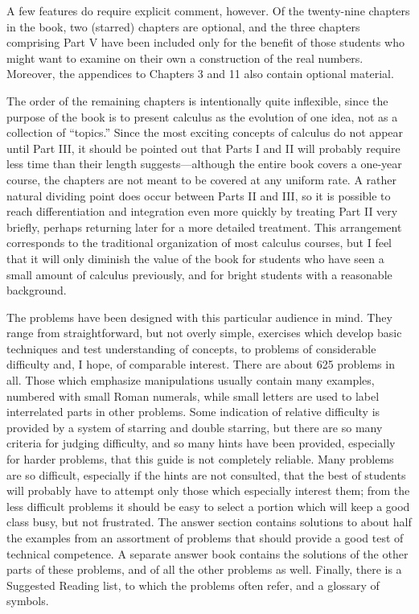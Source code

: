 A few features do require explicit comment, however. Of the twenty-nine
chapters in the book, two (starred) chapters are optional, and the three
chapters comprising Part V have been included only for the benefit of those
students who might want to examine on their own a construction of the real
numbers. Moreover, the appendices to Chapters 3 and 11 also contain optional
material.

The order of the remaining chapters is intentionally quite inflexible, since
the purpose of the book is to present calculus as the evolution of one idea,
not as a collection of ``topics.'' Since the most exciting concepts of calculus
do not appear until Part III, it should be pointed out that Parts I and II
will probably require less time than their length suggests---although the
entire book covers a one-year course, the chapters are not meant to be covered
at any uniform rate. A rather natural dividing point does occur between
Parts II and III, so it is possible to reach differentiation and integration
even more quickly by treating Part II very briefly, perhaps returning later for
a more detailed treatment. This arrangement corresponds to the traditional
organization of most calculus courses, but I feel that it will only diminish
the value of the book for students who have seen a small amount of calculus
previously, and for bright students with a reasonable background.

The problems have been designed with this particular audience in mind. They
range from straightforward, but not overly simple, exercises which develop
basic techniques and test understanding of concepts, to problems of
considerable difficulty and, I hope, of comparable interest. There are about
625 problems in all. Those which emphasize manipulations usually contain many
examples, numbered with small Roman numerals, while small letters are used to
label interrelated parts in other problems. Some indication of relative
difficulty is provided by a system of starring and double starring, but there
are so many criteria for judging difficulty, and so many hints have been
provided, especially for harder problems, that this guide is not completely
reliable. Many problems are so difficult, especially if the hints are not
consulted, that the best of students will probably have to attempt only those
which especially interest them; from the less difficult problems it should be
easy to select a portion which will keep a good class busy, but not
frustrated. The answer section contains solutions to about half the examples
from an assortment of problems that should provide a good test of technical
competence. A separate answer book contains the solutions of the other parts
of these problems, and of all the other problems as well. Finally, there is a
Suggested Reading list, to which the problems often refer, and a glossary of
symbols.

